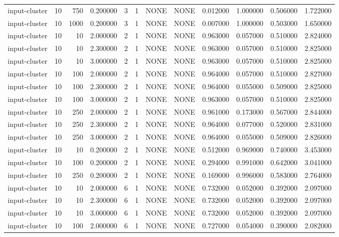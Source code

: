 \begin{tabular}{lrrrllllrrrr}
input-cluster & 10 & 750 & 0.200000 & 3 & 1 & NONE & NONE & 0.012000 & 1.000000 & 0.506000 & 1.722000 \\
input-cluster & 10 & 1000 & 0.200000 & 3 & 1 & NONE & NONE & 0.007000 & 1.000000 & 0.503000 & 1.650000 \\
input-cluster & 10 & 10 & 2.000000 & 2 & 1 & NONE & NONE & 0.963000 & 0.057000 & 0.510000 & 2.824000 \\
input-cluster & 10 & 10 & 2.300000 & 2 & 1 & NONE & NONE & 0.963000 & 0.057000 & 0.510000 & 2.825000 \\
input-cluster & 10 & 10 & 3.000000 & 2 & 1 & NONE & NONE & 0.963000 & 0.057000 & 0.510000 & 2.825000 \\
input-cluster & 10 & 100 & 2.000000 & 2 & 1 & NONE & NONE & 0.964000 & 0.057000 & 0.510000 & 2.827000 \\
input-cluster & 10 & 100 & 2.300000 & 2 & 1 & NONE & NONE & 0.964000 & 0.055000 & 0.509000 & 2.825000 \\
input-cluster & 10 & 100 & 3.000000 & 2 & 1 & NONE & NONE & 0.963000 & 0.057000 & 0.510000 & 2.825000 \\
input-cluster & 10 & 250 & 2.000000 & 2 & 1 & NONE & NONE & 0.961000 & 0.173000 & 0.567000 & 2.844000 \\
input-cluster & 10 & 250 & 2.300000 & 2 & 1 & NONE & NONE & 0.964000 & 0.077000 & 0.520000 & 2.831000 \\
input-cluster & 10 & 250 & 3.000000 & 2 & 1 & NONE & NONE & 0.964000 & 0.055000 & 0.509000 & 2.826000 \\
input-cluster & 10 & 10 & 0.200000 & 2 & 1 & NONE & NONE & 0.512000 & 0.969000 & 0.740000 & 3.453000 \\
input-cluster & 10 & 100 & 0.200000 & 2 & 1 & NONE & NONE & 0.294000 & 0.991000 & 0.642000 & 3.041000 \\
input-cluster & 10 & 250 & 0.200000 & 2 & 1 & NONE & NONE & 0.169000 & 0.996000 & 0.583000 & 2.764000 \\
input-cluster & 10 & 10 & 2.000000 & 6 & 1 & NONE & NONE & 0.732000 & 0.052000 & 0.392000 & 2.097000 \\
input-cluster & 10 & 10 & 2.300000 & 6 & 1 & NONE & NONE & 0.732000 & 0.052000 & 0.392000 & 2.097000 \\
input-cluster & 10 & 10 & 3.000000 & 6 & 1 & NONE & NONE & 0.732000 & 0.052000 & 0.392000 & 2.097000 \\
input-cluster & 10 & 100 & 2.000000 & 6 & 1 & NONE & NONE & 0.727000 & 0.054000 & 0.390000 & 2.082000 \\

\end{tabular}
